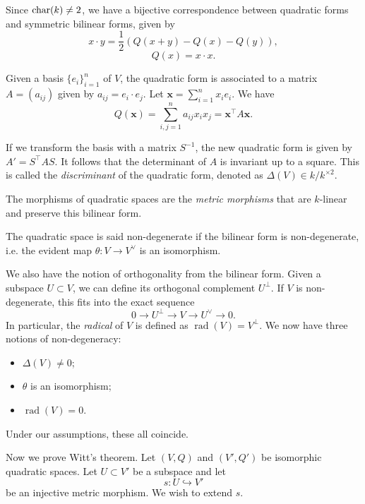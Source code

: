 \documentclass{article}
\newcommand{\rad}{\operatorname{rad}}
\begin{document}
Since $\operatorname{char}(k)\neq 2$, we have a bijective correspondence between quadratic forms and symmetric bilinear forms, given by
\begin{equation*}
    x\cdot y=\frac{1}{2}\left(Q(x+y)-Q(x)-Q(y)\right),
\end{equation*}
\begin{equation*}
    Q(x)=x\cdot x.
\end{equation*}

Given a basis $\{e_i\}_{i=1}^n$ of $V$, the quadratic form is associated to a matrix $A=(a_{ij})$ given by $a_{ij}=e_i\cdot e_j$. Let $\mathbf{x}=\sum_{i=1}^n x_ie_i$. We have
\begin{equation*}
    Q(\mathbf{x}) = \sum_{i,j=1}^n a_{ij}x_ix_j = \mathbf{x}^\top A \mathbf{x}.
\end{equation*}

If we transform the basis with a matrix $S^{-1}$, the new quadratic form is given by $A'=S^\top A S$. It follows that the determinant of $A$ is invariant up to a square. This is called the \emph{discriminant} of the quadratic form, denoted as $\Delta(V)\in k/k^{\times 2}$.
    
The morphisms of quadratic spaces are the \emph{metric morphisms} that are $k$-linear and preserve this bilinear form. 

The quadratic space is said non-degenerate if the bilinear form is non-degenerate, i.e. the evident map $\theta:V\to V^\vee$ is an isomorphism.

We also have the notion of orthogonality from the bilinear form. Given a subspace $U\subset V$, we can define its orthogonal complement $U^\bot$. If $V$ is non-degenerate, this fits into the exact sequence
\begin{equation}\label{eq.ortho}
    0\longrightarrow U^\bot \longrightarrow V \longrightarrow U^\vee \longrightarrow 0.
\end{equation}
In particular, the \emph{radical} of $V$ is defined as $\rad(V)=V^\bot$.
We now have three notions of non-degeneracy:
\begin{itemize}[nosep, label=$\circ$]
    \item $\Delta(V)\neq 0$;
    \item $\theta$ is an isomorphism;
    \item $\rad(V)=0$.
\end{itemize}
Under our assumptions, these all coincide.

Now we prove Witt's theorem. Let $(V,Q)$ and $(V',Q')$ be isomorphic quadratic spaces. Let $U\subset V'$ be a subspace and let
\begin{equation*}
    s: U\hookrightarrow V'
\end{equation*}
be an injective metric morphism. We wish to extend $s$.
\end{document}
